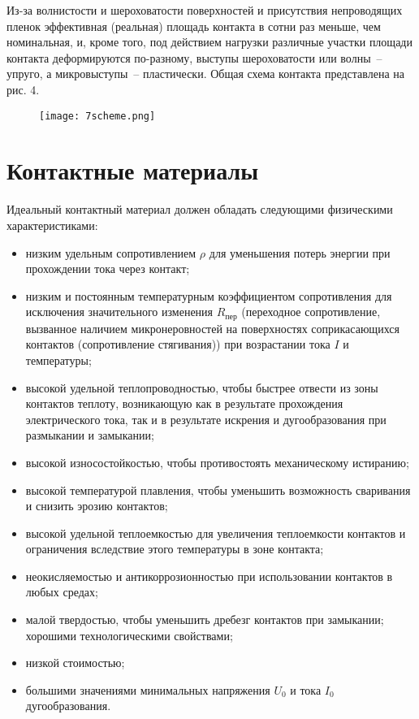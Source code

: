 Из-за волнистости и шероховатости поверхностей и присутствия непроводящих пленок эффективная (реальная) площадь контакта в сотни раз меньше, чем номинальная, и, кроме того, под действием нагрузки различные участки площади контакта деформируются по-разному, выступы шероховатости или волны~-- упруго, а микровыступы~-- пластически. Общая схема контакта представлена на рис. 4.

\begin{figure}[h!]
	\texttt{[image: 7scheme.png]}
	\label{pic:7scheme}
\end{figure}

\section{Контактные материалы}
Идеальный контактный материал должен обладать следующими физическими характеристиками: 
\begin{itemize}
\item низким удельным сопротивлением $ \rho $ для уменьшения потерь энергии при прохождении тока через контакт; 
\item низким и постоянным температурным коэффициентом сопротивления для исключения значительного изменения $ R_\text{пер} $ (переходное сопротивление, вызванное наличием микронеровностей на поверхностях соприкасающихся контактов (сопротивление стягивания)) при возрастании тока $ I $ и температуры;
\item высокой удельной теплопроводностью, чтобы быстрее отвести из зоны контактов теплоту, возникающую как в результате прохождения электрического тока, так и в результате искрения и дугообразования при размыкании и замыкании; 
\item высокой износостойкостью, чтобы противостоять механическому истиранию; 
\item высокой температурой плавления, чтобы уменьшить возможность сваривания и снизить эрозию контактов; 
\item высокой удельной теплоемкостью для увеличения теплоемкости контактов и ограничения вследствие этого температуры в зоне контакта;
\item неокисляемостью и антикоррозионностью при использовании контактов в любых средах; 
\item малой твердостью, чтобы уменьшить дребезг контактов при замыкании; хорошими технологическими свойствами; 
\item низкой стоимостью; 
\item большими значениями минимальных напряжения $ U_0 $ и тока $ I_0 $  дугообразования. 
\end{itemize}

